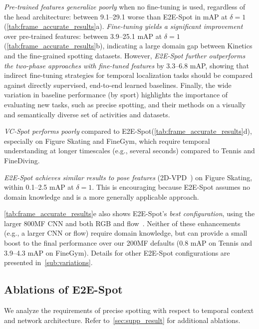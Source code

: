 \documentclass[runningheads]{llncs}
\newcommand{\notation}[1]{\ensuremath{#1}\xspace}
\newcommand{\OURMETHOD}{{E2E-Spot}\xspace}
\newcommand{\finegym}{{FineGym}\xspace}
\newcommand{\finediving}{{FineDiving}\xspace}
\newcommand{\Tolerance}{\notation{\delta}}
\begin{document}
\textit{Pre-trained features generalize poorly} when no
fine-tuning is used, regardless of the head architecture: between 9.1--29.1 worse than \OURMETHOD in mAP at $\Tolerance=1$ (\autoref{tab:frame_accurate_results}a).
\textit{Fine-tuning yields a significant improvement} over pre-trained features: between 3.9--25.1 mAP at $\Tolerance=1$ (\autoref{tab:frame_accurate_results}b), indicating a large domain gap between Kinetics and the fine-grained spotting datasets.
However, \textit{\OURMETHOD further outperforms the two-phase approaches with fine-tuned features} by 3.3--6.8 mAP, showing that indirect fine-tuning strategies for temporal localization tasks should be compared against directly supervised, end-to-end learned baselines.
Finally, the wide variation in baseline performance (by sport) highlights the importance of evaluating new tasks, such as precise spotting, and their methods on a visually and semantically diverse set of activities and datasets.

\textit{VC-Spot performs poorly} compared to \OURMETHOD (\autoref{tab:frame_accurate_results}d), especially on Figure Skating and \finegym, which require temporal understanding at longer timescales (e.g., several seconds) compared to Tennis and \finediving.

\textit{\OURMETHOD achieves similar results to pose features} (2D-VPD~\cite{vpd}) on Figure Skating, within 0.1--2.5 mAP at $\Tolerance=1$.
This is encouraging because \OURMETHOD assumes no domain knowledge and is a more generally applicable approach.

\autoref{tab:frame_accurate_results}e also shows \OURMETHOD's \textit{best configuration}, using the larger 800MF CNN and both RGB and flow~\cite{raft}.
Neither of these enhancements (e.g., a larger CNN or flow) require domain knowledge, but can provide a small boost to the final performance over our 200MF defaults (0.8 mAP on Tennis and 3.9--4.3 mAP on \finegym).
Details for other \OURMETHOD configurations are presented in~\autoref{sub:variations}.

\subsection{Ablations of \OURMETHOD}
\label{sub:ablation}

We analyze the requirements of precise spotting with respect to temporal context and network architecture. Refer to~\autoref{sec:supp_result} for additional ablations.
\end{document}
